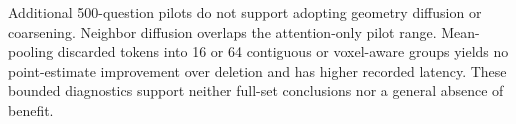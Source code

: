 Additional 500-question pilots do not support adopting geometry diffusion or coarsening. Neighbor diffusion overlaps the attention-only pilot range. Mean-pooling discarded tokens into 16 or 64 contiguous or voxel-aware groups yields no point-estimate improvement over deletion and has higher recorded latency. These bounded diagnostics support neither full-set conclusions nor a general absence of benefit.
